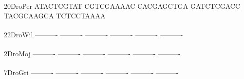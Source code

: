 \documentclass[11pt,twoside,reqno,a4paper]{article}
\begin{document}
{20\hspace*{3\charwidth}DroPer	ATACTCGTAT	CGTCGAAAAC	CACGAGCTGA	GATCTCGACC	TACGCAAGCA	TCTCCTAAAA	\\
\hspace*{5\charwidth}\hspace*{7\charwidth}\hspace*{1\charwidth}\hspace*{1\charwidth}\hspace*{1\charwidth}\hspace*{1\charwidth}\hspace*{1\charwidth}\hspace*{1\charwidth}\\
22\hspace*{3\charwidth}DroWil	----------	----------	----------	----------	----------	----------	\\
\hspace*{5\charwidth}\hspace*{7\charwidth}\hspace*{1\charwidth}\hspace*{1\charwidth}\hspace*{1\charwidth}\hspace*{1\charwidth}\hspace*{1\charwidth}\hspace*{1\charwidth}\\
2\hspace*{4\charwidth}DroMoj	----------	----------	----------	----------	----------	----------	\\
\hspace*{5\charwidth}\hspace*{7\charwidth}\hspace*{1\charwidth}\hspace*{1\charwidth}\hspace*{1\charwidth}\hspace*{1\charwidth}\hspace*{1\charwidth}\hspace*{1\charwidth}\\
7\hspace*{4\charwidth}DroGri	----------	----------	----------	----------	----------	----------	\\
\hspace*{5\charwidth}\hspace*{7\charwidth}\hspace*{1\charwidth}\hspace*{1\charwidth}\hspace*{1\charwidth}\hspace*{1\charwidth}\hspace*{1\charwidth}\hspace*{1\charwidth}\\
}
\end{document}
